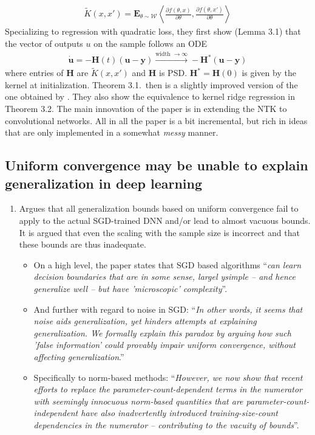 \documentclass[12pt,a4paper]{article}
\newcommand{\mb}{\mathbf}
\newcommand{\mc}{\mathcal}
\newcommand{\E}{\mathbf E}
\begin{document}
\begin{enumerate}
\begin{align}
\tilde K(x,x') = \E_{\theta \sim \mc W} \left\langle  \frac{\partial f(\theta,x)}{\partial \theta}, \frac{\partial f(\theta,x')}{\partial \theta} \right\rangle
\end{align}
Specializing to regression with quadratic loss, they first show (Lemma 3.1) that the vector of outputs $u$ on the sample follows an ODE
\begin{align}
\dot {\mb u} = - \mb H(t) (\mb u- \mb y) \stackrel{\text{width $\to \infty$}} \to - \mb H^*  (\mb u- \mb y)
\end{align}
where entries of $\mb H$ are $\tilde K(x,x')$ and $\mb H$ is PSD.  $\mb H^* = \mb H(0) $ is given by the kernel at initialization. Theorem 3.1.~then is a slightly improved version of the one obtained by \cite{jacot2018neural}. They also show the equivalence to kernel ridge regression in Theorem 3.2. The main innovation of the paper is in extending the NTK to convolutional networks. All in all the paper is a bit incremental, but rich in ideas that are only implemented in a somewhat \textit{messy} manner. 
\end{enumerate}

\subsection{Uniform convergence may be unable to explain generalization in deep learning \cite{nagarajan2019uniform}}
\begin{enumerate}
\item Argues that all generalization bounds based on uniform convergence fail to apply to the actual SGD-trained DNN and/or lead to almost vacuous bounds. It is argued that even the scaling with the sample size is incorrect and that these bounds are thus inadequate. 
\begin{itemize}
\item On a high level, the paper states that SGD based algorithms ``\textit{can learn decision boundaries that are in some sense, largel ysimple -- and hence generalize well -- but have 'microscopic' complexity}''. 
\item And further with regard to noise in SGD: ``\textit{In other words, it seems that noise aids generalization, yet hinders attempts at explaining generalization. We formally explain this paradox by arguing how such 'false information' could provably impair uniform convergence, without affecting generalization}.'' 
\item Specifically to norm-based methods: ``\textit{However, we now show that recent efforts to replace the parameter-count-dependent terms in the numerator with seemingly innocuous norm-based quantities that are parameter-count-independent have also inadvertently introduced training-size-count dependencies in the numerator -- contributing to the vacuity of bounds}''.
\end{itemize}
\end{enumerate}
\end{document}
